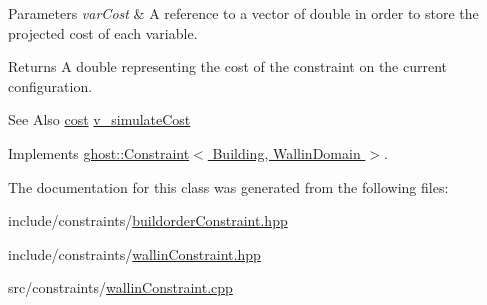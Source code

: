 \begin{DoxyParams}{Parameters}
{\em var\-Cost} & A reference to a vector of double in order to store the projected cost of each variable. \\
\hline
\end{DoxyParams}
\begin{DoxyReturn}{Returns}
A double representing the cost of the constraint on the current configuration. 
\end{DoxyReturn}
\begin{DoxySeeAlso}{See Also}
\hyperlink{classghost_1_1Constraint_a5051092934738b004fe848190a5aa9a5}{cost} \hyperlink{classghost_1_1BuildOrderConstraint_a3ffc8f323b117f17c76cc6df522345ba}{v\-\_\-simulate\-Cost} 
\end{DoxySeeAlso}


Implements \hyperlink{classghost_1_1Constraint_ac67f7952cdf7212327b7db506225d12c}{ghost\-::\-Constraint$<$ Building, Wallin\-Domain $>$}.



The documentation for this class was generated from the following files\-:\begin{DoxyCompactItemize}
\item 
include/constraints/\hyperlink{buildorderConstraint_8hpp}{buildorder\-Constraint.\-hpp}\item 
include/constraints/\hyperlink{wallinConstraint_8hpp}{wallin\-Constraint.\-hpp}\item 
src/constraints/\hyperlink{wallinConstraint_8cpp}{wallin\-Constraint.\-cpp}\end{DoxyCompactItemize}
